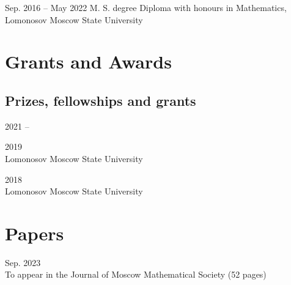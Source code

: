 \documentclass[11pt,letterpaper]{report}
\begin{document}
    \begin{tablist}

        \item[Sep. 2016 -- May 2022]  \tab{}M. S. degree Diploma with honours in Mathematics,\\ Lomonosov Moscow State University 

    \end{tablist}
    
    
    
    
    
    \section*{Grants and Awards}

    \subsection*{Prizes, fellowships and grants}

    \begin{tablist}

        \item[2021 --]  
        \item[2019] \\ Lomonosov Moscow State University
        \item[2018] \\ Lomonosov Moscow State University

    \end{tablist}




    


    \section*{Papers}

    \begin{tablist}

        \item[Sep. 2023] \\ To appear in the Journal of Moscow Mathematical Society (52 pages)
        
    \end{tablist}
    
\end{document}
